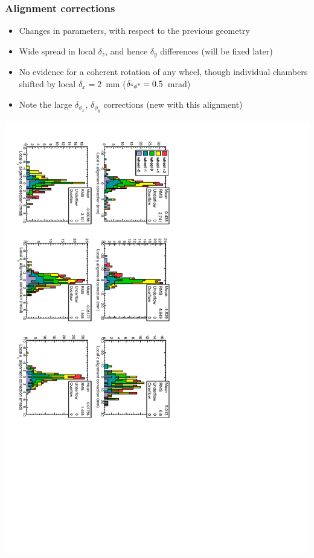 \documentclass[compress]{beamer}
\begin{document}
\begin{frame}
\frametitle{Alignment corrections}

\begin{itemize}
\item Changes in parameters, with respect to the previous geometry
\item Wide spread in local $\delta_z$, and hence $\delta_y$ differences (will be fixed later)
\item No evidence for a coherent rotation of any wheel, though individual chambers shifted by local $\delta_x = 2$~mm ($\delta_{\mbox{\scriptsize ``$\phi$''}} = 0.5$~mrad)
\item Note the large $\delta_{\phi_x}$, $\delta_{\phi_y}$ corrections (new with this alignment)
\end{itemize}

\vfill
\includegraphics[height=0.95\linewidth, angle=90]{data_alignment_corrections.pdf}
\end{frame}
\end{document}
